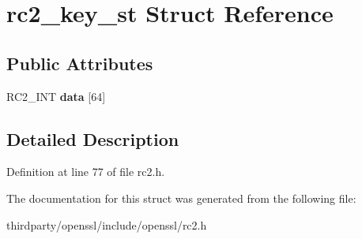 \hypertarget{structrc2__key__st}{}\section{rc2\+\_\+key\+\_\+st Struct Reference}
\label{structrc2__key__st}
\subsection*{Public Attributes}
\begin{DoxyCompactItemize}
\item 
\mbox{\label{structrc2__key__st_a4626a56b45c5ae4d5971705c55eea281}} 
R\+C2\+\_\+\+I\+NT {\bfseries data} \mbox{[}64\mbox{]}
\end{DoxyCompactItemize}


\subsection{Detailed Description}


Definition at line 77 of file rc2.\+h.



The documentation for this struct was generated from the following file\+:\begin{DoxyCompactItemize}
\item 
thirdparty/openssl/include/openssl/rc2.\+h\end{DoxyCompactItemize}
